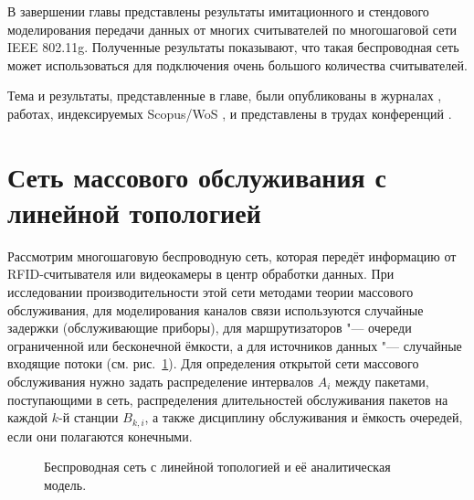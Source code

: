 В завершении главы представлены результаты имитационного и стендового моделирования передачи данных от многих считывателей по многошаговой сети IEEE 802.11g. Полученные результаты показывают, что такая беспроводная сеть может использоваться для подключения очень большого количества считывателей.

Тема и результаты, представленные в главе, были опубликованы в журналах \cite{WINET_IJPAM2016, WINET_TCOMM2015, QS_JITCS2013, QS_JPU2013, QS_TCOMM2012}, работах, индексируемых Scopus/WoS \cite{QS_ICAAPSP2020, QS_ITMM2019, QS_ITMM2017, QS_AICT2017, QS_ITMM2016, QS_DCCN2016_CCIS}, и представлены в трудах конференций \cite{WINET_DCCN2018, QS_ITTMM2015, QS_DCCN2015}.






\section{Сеть массового обслуживания с линейной топологией}\label{sec:ch4_queueing_network}
Рассмотрим многошаговую беспроводную сеть, которая передёт информацию от RFID-считывателя или видеокамеры в центр обработки данных. При исследовании производительности этой сети методами теории массового обслуживания, для моделирования каналов связи используются случайные задержки (обслуживающие приборы), для маршрутизаторов "--- очереди ограниченной или бесконечной ёмкости, а для источников данных "--- случайные входящие потоки (см. рис.~\ref{fig:ch4_network_model}). Для определения открытой сети массового обслуживания нужно задать распределение интервалов $A_i$ между пакетами, поступающими в сеть, распределения длительностей обслуживания пакетов на каждой $k$-й станции $B_{k,i}$, а также дисциплину обслуживания и ёмкость очередей, если они полагаются конечными.

\begin{figure}[h]
  \caption{Беспроводная сеть с линейной топологией и её аналитическая модель.}
  \label{fig:ch4_network_model}
\end{figure}


